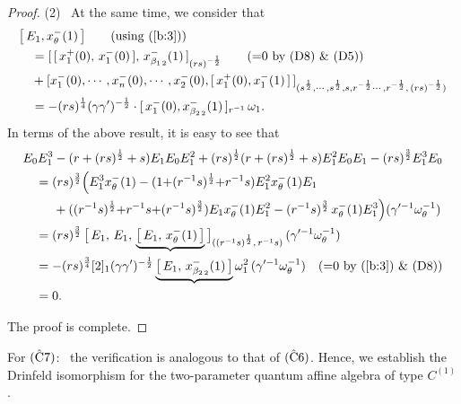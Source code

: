 \documentclass{amsproc}
\theoremstyle{remark}
\numberwithin{equation}{section}
\begin{document}
\begin{proof}
(2) \,  At the same time, we consider that
\begin{equation*}
\begin{split}
&\bigl[\,E_1, x^-_{\theta}(1)\,\bigr]\qquad \hbox{(using (\ref{b:3}))}\\
&\quad=[\,[\,x_1^{+}(0),\,x_1^-(0)\,],\,x_{\beta_{1\,2}}^-(1)\,]_{(rs)^{-\frac{1}{2}}}
\qquad(\hbox{=0 by (D8) \& (D5)})\\
&\quad+[x_1^-(0),\cdots,x_n^-(0),\cdots,x_2^-(0),
[\,x_1^+(0),x_1^-(1)\,]\,]_{(s^{\frac{1}{2}},\cdots,s^{\frac{1}{2}},s,r^{-\frac{1}{2}}
\cdots,r^{-\frac{1}{2}},\,(rs)^{-\frac{1}{2}})}\\
&\quad=-(rs)^{\frac1{4}}(\gamma\gamma')^{-\frac{1}{2}}\cdot
[\,x_1^-(0),x_{\beta_{2\,2}}^-(1)\,]_{r^{-1}}\,{\omega}_1.
\end{split}
\end{equation*}
In terms of the above result, it is easy to see that
\begin{equation*}
\begin{split}
 &E_0E_1^3-(r+(rs)^{\frac{1}{2}}+s)E_1E_0E_1^2+
(rs)^{\frac{1}{2}}(r+(rs)^{\frac{1}{2}}+s)E_1^2E_0E_1-(rs)^{\frac{3}{2}}E_1^3E_0\\
&\quad=(rs)^{\frac{3}{2}}\Big(E_1^3 x^-_{\theta}(1)-(1{+}(r^{-1}s)^{\frac{1}{2}}{+}
r^{-1}s)E_1^2x^-_{\theta}(1)E_1\\
&\quad\hskip0.5cm +((r^{-1}s)^{\frac{1}{2}}{+}
r^{-1}s{+}(r^{-1}s)^{\frac{3}{2}})E_1x^-_{\theta}(1)E_1^2
-(r^{-1}s)^{\frac{3}{2}}\,x^-_{\theta}(1)E_1^3\Big)
(\gamma'^{-1}{\omega}_{\theta}^{-1})\\
&\quad= (rs)^{\frac{3}{2}}\,\bigl[\,E_1, \,E_1,\,
\underbrace{\bigl[\,E_1,\,x^-_{\theta}(1)\,
\bigr]}\,\bigr]_{((r^{-1}s)^{\frac{1}{2}},\,r^{-1}s)}
\,(\gamma'^{-1}{\omega}_{\theta}^{-1})\\
&\quad=-(rs)^{\frac{3}{4}}[2]_1(\gamma\gamma')^{-\frac{1}{2}}
\underbrace{\bigl[\,E_1,\,x^-_{\beta_{2\,2}}(1)\,
\bigr]}{\omega}_1^2\,(\gamma'^{-1}{\omega}_{\theta}^{-1})\quad
(\hbox{=0 by (\ref{b:3}) \& $(\textrm{D8})$})\\
&\quad=0.
\end{split}
\end{equation*}

The proof is complete.
\end{proof}

For $(\hat{\rm C}7)$: \ the verification is analogous to that of
$(\hat{\rm C}6)$. Hence, we establish the Drinfeld isomorphism for
the two-parameter quantum affine algebra of type $C^{(1)}$.
\end{document}
